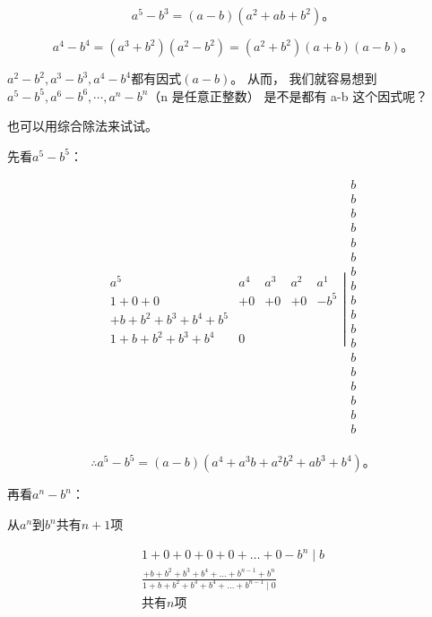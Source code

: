 \[
a ^{5} - b ^{3} = (a - b) \left(a ^{2} + a b + b ^{2}\right)\text{。}
\]

\[
a ^{4} - b ^{4} = (a ^{3} + b ^{2}) (a ^{2} - b ^{2}) = (a ^{2} + b ^{2}) (a + b) (a - b)\text{。}
\]

\(a^{2}-b^{2},a^{3}-b^{3},a^{4}-b^{4}\)都有因式\((a-b)\)。 从而，
我们就容易想到\(a^{5}-b^{5},a^{6}-b^{6},\cdots,a^{n}-b^{n}\)（n
是任意正整数） 是不是都有 a-b 这个因式呢？

也可以用综合除法来试试。

先看\(a^5 - b^5\)：

\[
\left. \begin{array}{ccccc} a ^{5} & a ^{4} & a ^{3} & a ^{2} & a ^{1} \\ 1 + 0 + 0 & + 0 & + 0 & + 0 & - b ^{5} \\ + b + b ^{2} + b ^{3} + b ^{4} + b ^{5} \\ 1 + b + b ^{2} + b ^{3} + b ^{4} & 0 \end{array} \right| \begin{array}{l} b \\ b \\ b \\ b \\ b \\ b \\ b \\ b \\ b \\ b \\ b \\ b \\ b \\ b \\ b \\ b \\ b \\ b \\ \end{array}
\]

\[
\therefore a ^{5} - b ^{5} = (a - b) \left(a ^{4} + a ^{3} b + a ^{2} b ^{2} + a b ^{3} + b ^{4}\right)\text{。}
\]

再看\(a^n - b^n\)：

从\(a^n\)到\(b^n\)共有\(n + 1\)项

\[
\begin{array}{l} 1 + 0 + 0 + 0 + 0 + \dots + 0 - b ^{n} \mid b \\ \frac{+ b + b ^{2} + b ^{3} + b ^{4} + \dots + b ^{n - 1} + b ^{n}}{1 + b + b ^{2} + b ^{3} + b ^{4} + \dots + b ^{n - 1} \mid 0} \\ \text{共有} n \text{项} \end{array}
\]

